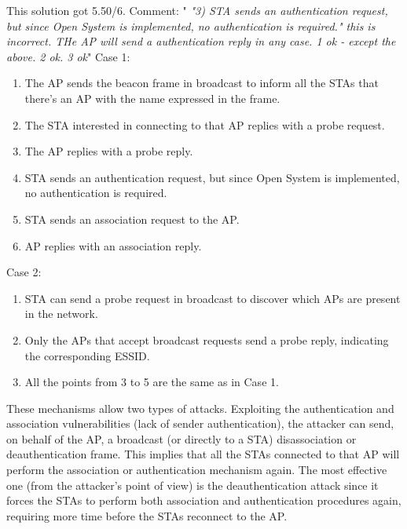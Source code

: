 \begin{solution}
    This solution got 5.50/6. Comment: "\textit{ "3) STA sends an authentication request, but since Open System is implemented, no authentication is required." this is incorrect. THe AP will send a authentication reply in any case. 1 ok - except the above. 2 ok. 3 ok}" 
    Case 1:
    \begin{enumerate}
        \item The AP sends the beacon frame in broadcast to inform all the STAs that there's an AP with the name expressed in the frame.
        \item The STA interested in connecting to that AP replies with a probe request.
        \item The AP replies with a probe reply.
        \item STA sends an authentication request, but since Open System is implemented, no authentication is required.
        \item STA sends an association request to the AP.
        \item AP replies with an association reply.
    \end{enumerate}

    Case 2:
    \begin{enumerate}
        \item STA can send a probe request in broadcast to discover which APs are present in the network.
        \item Only the APs that accept broadcast requests send a probe reply, indicating the corresponding ESSID.
        \item All the points from 3 to 5 are the same as in Case 1.
    \end{enumerate}

    These mechanisms allow two types of attacks. Exploiting the authentication and association vulnerabilities (lack of sender authentication), the attacker can send, on behalf of the AP, a broadcast (or directly to a STA) disassociation or deauthentication frame. This implies that all the STAs connected to that AP will perform the association or authentication mechanism again. The most effective one (from the attacker's point of view) is the deauthentication attack since it forces the STAs to perform both association and authentication procedures again, requiring more time before the STAs reconnect to the AP.

\end{solution}

